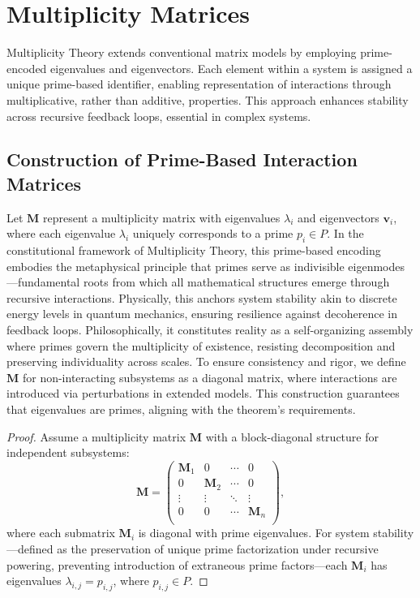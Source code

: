 \documentclass{article}
\theoremstyle{plain}
\begin{document}
\section{Multiplicity Matrices}

Multiplicity Theory extends conventional matrix models by employing prime-encoded eigenvalues and eigenvectors. Each element within a system is assigned a unique prime-based identifier, enabling representation of interactions through multiplicative, rather than additive, properties. This approach enhances stability across recursive feedback loops, essential in complex systems.

\subsection{Construction of Prime-Based Interaction Matrices}
Let $\mathbf{M}$ represent a multiplicity matrix with eigenvalues $\lambda_i$ and eigenvectors $\mathbf{v}_i$, where each eigenvalue $\lambda_i$ uniquely corresponds to a prime $p_i \in P$. In the constitutional framework of Multiplicity Theory, this prime-based encoding embodies the metaphysical principle that primes serve as indivisible eigenmodes—fundamental roots from which all mathematical structures emerge through recursive interactions. Physically, this anchors system stability akin to discrete energy levels in quantum mechanics, ensuring resilience against decoherence in feedback loops. Philosophically, it constitutes reality as a self-organizing assembly where primes govern the multiplicity of existence, resisting decomposition and preserving individuality across scales.
To ensure consistency and rigor, we define $\mathbf{M}$ for non-interacting subsystems as a diagonal matrix, where interactions are introduced via perturbations in extended models. This construction guarantees that eigenvalues are primes, aligning with the theorem's requirements.
\begin{proof}
Assume a multiplicity matrix $\mathbf{M}$ with a block-diagonal structure for independent subsystems:
\begin{equation}
\mathbf{M} = 
\begin{pmatrix}
\mathbf{M}_1 & 0 & \cdots & 0 \\
0 & \mathbf{M}_2 & \cdots & 0 \\
\vdots & \vdots & \ddots & \vdots \\
0 & 0 & \cdots & \mathbf{M}_n \\
\end{pmatrix},
\end{equation}
where each submatrix $\mathbf{M}_i$ is diagonal with prime eigenvalues. For system stability—defined as the preservation of unique prime factorization under recursive powering, preventing introduction of extraneous prime factors—each $\mathbf{M}_i$ has eigenvalues $\lambda_{i,j} = p_{i,j}$, where $p_{i,j} \in P$.
\end{proof}
\end{document}
